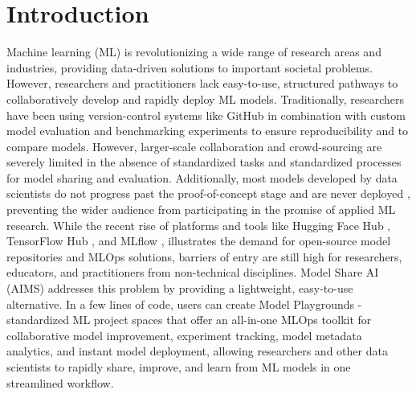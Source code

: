 \section{Introduction}
Machine learning (ML) is revolutionizing a wide range of research areas and industries, providing data-driven solutions to important societal problems. However, researchers and practitioners lack easy-to-use, structured pathways to collaboratively develop and rapidly deploy ML models. Traditionally, researchers have been using version-control systems like GitHub in combination with custom model evaluation and benchmarking experiments to ensure reproducibility and to compare models. However, larger-scale collaboration and crowd-sourcing are severely limited in the absence of standardized tasks and standardized processes for model sharing and evaluation. Additionally, most models developed by data scientists do not progress past the proof-of-concept stage and are never deployed \citep{davenport_is_2022, siegel_models_2022}, preventing the wider audience from participating in the promise of applied ML research. While the recent rise of platforms and tools like Hugging Face Hub \citep{noauthor_hugging_2023}, TensorFlow Hub \citep{noauthor_tensorflow_2023}, and MLflow \citep{chen_developments_2020, noauthor_mlflow_2023, zaharia_accelerating_2018}, illustrates the demand for open-source model repositories and MLOps solutions, barriers of entry are still high for researchers, educators, and practitioners from non-technical disciplines. Model Share AI (AIMS) addresses this problem by providing a lightweight, easy-to-use alternative. In a few lines of code, users can create Model Playgrounds - standardized ML project spaces that offer an all-in-one MLOps toolkit for collaborative model improvement, experiment tracking, model metadata analytics, and instant model deployment, allowing researchers and other data scientists to rapidly share, improve, and learn from ML models in one streamlined workflow.


